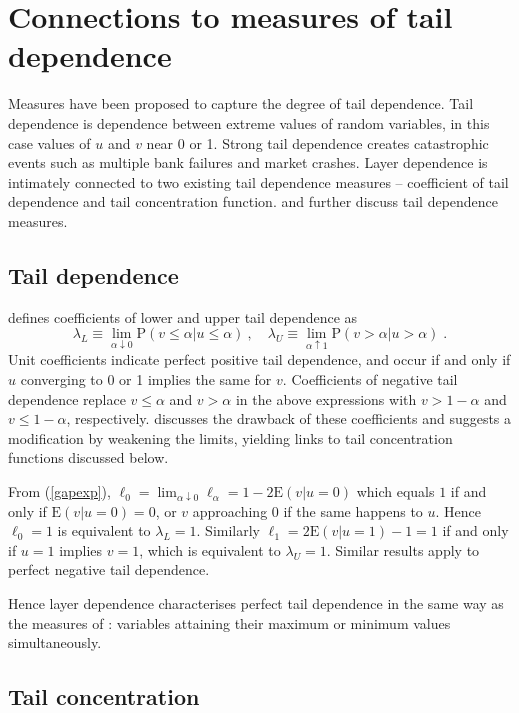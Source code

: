 \documentclass[authoryear]{elsarticle}
\newcommand{\E}{{\mathrm E}}
\newcommand{\p}{\mathrm{P}}
\newcommand{\cq}{\ ,\quad }
\newcommand{\eref}[1]{(\ref{#1})}
\begin{document}
\section{Connections to measures of tail dependence}\label{sliterature}

Measures have been proposed to capture the degree of tail dependence. Tail dependence is dependence between extreme values of random variables, in this case values of $u$ and $v$ near 0 or 1. Strong tail dependence creates catastrophic events such as  multiple bank failures and  market crashes. Layer dependence is intimately connected to two existing tail dependence measures -- coefficient of tail dependence and tail concentration function. \cite{sweeting2013calculating} and \cite{durante2014copulas} further discuss tail dependence measures.


\subsection{Tail dependence}

\cite{joe1997multivariate} defines coefficients of lower and upper tail dependence as
$$
\lambda_L \equiv \lim_{\alpha\downarrow 0} \p(v\leq \alpha |u\leq \alpha) \cq
\lambda_U \equiv \lim_{\alpha\uparrow 1} \p(v>\alpha |u>\alpha) \;.
$$
Unit coefficients indicate perfect positive tail dependence, and occur if and only if $u$ converging to 0 or 1 implies the same for $v$. Coefficients of negative tail dependence replace $v\leq \alpha$ and $v>\alpha$ in the above expressions with $v>1-\alpha$ and $v\leq 1-\alpha$, respectively.  \cite{sweeting2013calculating} discusses the drawback of these coefficients and suggests a modification by weakening the limits, yielding links to tail concentration functions discussed below.

From \eref{gapexp}, $\ell_0=\lim_{\alpha\downarrow 0} \ell_\alpha=1-2\E(v|u=0)$ which equals $1$ if and only if $\E(v|u=0)=0$, or $v$ approaching 0 if the same happens to $u$. Hence $\ell_0=1$ is equivalent to $\lambda_L=1$. Similarly $\ell_1=2\E(v|u=1)-1=1$ if and only if $u=1$ implies $v=1$, which is equivalent to $\lambda_U=1$. Similar results apply to perfect negative tail dependence.

Hence layer dependence characterises perfect tail dependence in the same way as the measures of  \cite{joe1997multivariate}: variables attaining their maximum or minimum values simultaneously.



\subsection{Tail concentration}
\end{document}
